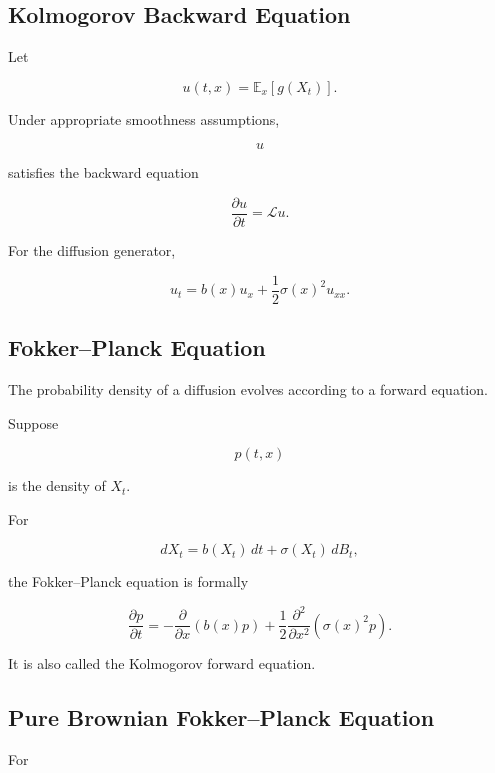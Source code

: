 \subsection{Kolmogorov Backward Equation}
\label{subsec:kolmogorov-backward-sde}

Let

\[
u(t,x)
=
\mathbb{E}_x
[
g(X_t)
].
\]

Under appropriate smoothness assumptions,

\[
u
\]

satisfies the backward equation

\[
\boxed{
\frac{\partial u}{\partial t}
=
\mathcal{L}u.
}
\]

For the diffusion generator,

\[
\boxed{
u_t
=
b(x)u_x
+
\frac12
\sigma(x)^2u_{xx}.
}
\]

\subsection{Fokker--Planck Equation}
\label{subsec:fokker-planck}

The probability density of a diffusion evolves according to a forward
equation.

Suppose

\[
p(t,x)
\]

is the density of \(X_t\).

For

\[
dX_t
=
b(X_t)\,dt
+
\sigma(X_t)\,dB_t,
\]

the Fokker--Planck equation is formally

\[
\boxed{
\frac{\partial p}{\partial t}
=
-
\frac{\partial}{\partial x}
\left(
b(x)p
\right)
+
\frac12
\frac{\partial^2}{\partial x^2}
\left(
\sigma(x)^2p
\right).
}
\]

It is also called the Kolmogorov forward equation.

\subsection{Pure Brownian Fokker--Planck Equation}
\label{subsec:brownian-fokker-planck}

For

